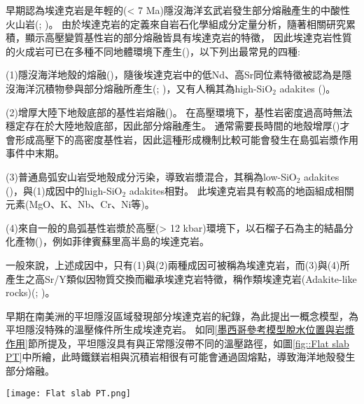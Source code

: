 早期認為埃達克岩是年輕的(< 7 Ma)隱沒海洋玄武岩發生部分熔融產生的中酸性火山岩(\citealp{defant1990derivation}; \citealp{peacock1994partial})。
由於埃達克岩的定義來自岩石化學組成分定量分析，隨著相關研究累積，顯示高壓變質基性岩的部分熔融皆具有埃達克岩的特徵，
因此埃達克岩性質的火成岩可已在多種不同地體環境下產生(\citealp{martin2005overview})，以下列出最常見的四種:

(1)隱沒海洋地殼的熔融(\citealp{defant1990derivation})，隨後埃達克岩中的低Nd、高Sr同位素特徵被認為是隱沒海洋沉積物參與部分熔融所產生(\citealp{stern1996role}; \citealp{gomez2003temporal})，又有人稱其為high-SiO$_2$ adakites (\citealp{martin2005overview})。

(2)增厚大陸下地殼底部的基性岩熔融(\citealp{kay1996magmatic})。
在高壓環境下，基性岩密度過高時無法穩定存在於大陸地殼底部，因此部分熔融產生。
通常需要長時間的地殼增厚(\citealp{kay2002magmatism})才會形成高壓下的高密度基性岩，因此這種形成機制比較可能會發生在島弧岩漿作用事件中末期。

(3)普通島弧安山岩受地殼成分污染，導致岩漿混合，其稱為low-SiO$_2$ adakites (\citealp{martin2005overview})，與(1)成因中的high-SiO$_2$ adakites相對。
此埃達克岩具有較高的地函組成相關元素(MgO、K、Nb、Cr、Ni等)。

(4)來自一般的島弧基性岩漿於高壓(> 12 kbar)環境下，以石榴子石為主的結晶分化產物(\citealp{moyen2009high})，例如菲律賓蘇里高半島的埃達克岩。

一般來說，上述成因中，只有(1)與(2)兩種成因可被稱為埃達克岩，而(3)與(4)所產生之高Sr/Y類似因物質交換而繼承埃達克岩特徵，稱作類埃達克岩(Adakite-like rocks)(\citealp{kay2002magmatism}; \citealp{goss2013andean})。

早期在南美洲的平坦隱沒區域發現部分埃達克岩的紀錄，\citet{Gutscher2000Bcan}為此提出一概念模型，為平坦隱沒特殊的溫壓條件所生成埃達克岩。
如同\ref{墨西哥參考模型脫水位置與岩漿作用}節所提及，平坦隱沒具有與正常隱沒帶不同的溫壓路徑，如圖\ref{fig::Flat slab PT}中所繪，此時鐵鎂岩相與沉積岩相很有可能會通過固熔點，導致海洋地殼發生部分熔融。

\begin{figure*}[ht!]
    \centering
    \texttt{[image: Flat slab PT.png]}
    \caption[隱沒板塊頂部可能的溫壓路徑圖，摘自\citet{Gutscher2000Bcan}]{隱沒板塊頂部可能的溫壓路徑圖，摘自\citet{Gutscher2000Bcan}。Ec—榴輝岩(eclogite)，Am—角閃岩(amphibolite)，Ga—石榴石(garnet)，Hb—角閃石(hornblende)。
    圓形為正常隱沒帶中的溫壓路徑，菱形與正方形則為平坦隱沒的溫壓路徑。其中，灰色底部分為隱沒板塊可能的部分熔融區。
    }
    \label{fig::Flat slab PT}
\end{figure*}

